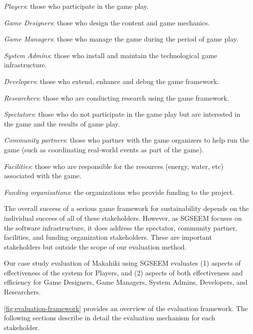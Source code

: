 \documentclass{sigchi}
\begin{document}
\begin{compactitem}
\item \emph{Players}: those who participate in the game play.
\item \emph{Game Designers}: those who design the content and game mechanics.
 \item \emph{Game Managers}: those who manage the game during the period of game play.
\item \emph{System Admins}: those who install and maintain the technological game infrastructure.
\item \emph{Developers}: those who extend, enhance and debug the game framework.
\item \emph{Researchers}: those who are conducting research using the game framework.
\item \emph{Spectators}: those who do not participate in the game
  play but are interested in the game and the results of game play.
\item \emph{Community partners}: those who partner
  with the game organizers to help run the game (such as coordinating real-world events as part of the game).
\item \emph{Facilities}: those who are responsible for the resources (energy, water, etc)
  associated with the game.
\item \emph{Funding organizations}: the organizations who provide
  funding to the project.
\end{compactitem}

The overall success of a serious game framework for sustainability depends on the
individual success of all of these stakeholders. However, as SGSEEM focuses on the software
infrastructure, it does address the spectator, community partner, facilities, and funding
organization stakeholders.  These are important stakeholders but outside the scope of our
evaluation method.

Our case study evaluation of Makahiki using SGSEEM evaluates (1) aspects of 
effectiveness of the system for Players, and (2) aspects of both effectiveness and
efficiency for Game Designers, Game Managers, System Admins, Developers, and Researchers. 

\autoref{fig:evaluation-framework} provides an overview of the evaluation framework. The
following sections describe in detail the evaluation mechanism for each stakeholder.
\end{document}
